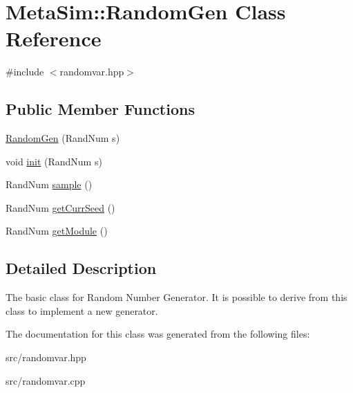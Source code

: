 \hypertarget{classMetaSim_1_1RandomGen}{}\section{Meta\+Sim\+:\+:Random\+Gen Class Reference}
\label{classMetaSim_1_1RandomGen}


{\ttfamily \#include $<$randomvar.\+hpp$>$}

\subsection*{Public Member Functions}
\begin{DoxyCompactItemize}
\item 
\hyperlink{group__metasim__random_gabaa90db3234c032b6650a1cffb523a55}{Random\+Gen} (Rand\+Num s)
\item 
void \hyperlink{group__metasim__random_ga533a4ad9a71fafe04a6b25491cd38e0b}{init} (Rand\+Num s)
\item 
Rand\+Num \hyperlink{group__metasim__random_ga94a34514116b265e8fd0bbbd35d662d9}{sample} ()
\item 
Rand\+Num \hyperlink{group__metasim__random_gaa97fbc23d68f3fa5e35e87c8c09a9624}{get\+Curr\+Seed} ()
\item 
Rand\+Num \hyperlink{group__metasim__random_gaac9729d6899351c58f6fd2684d0e62f8}{get\+Module} ()
\end{DoxyCompactItemize}


\subsection{Detailed Description}
The basic class for Random Number Generator. It is possible to derive from this class to implement a new generator. 

The documentation for this class was generated from the following files\+:\begin{DoxyCompactItemize}
\item 
src/randomvar.\+hpp\item 
src/randomvar.\+cpp\end{DoxyCompactItemize}
